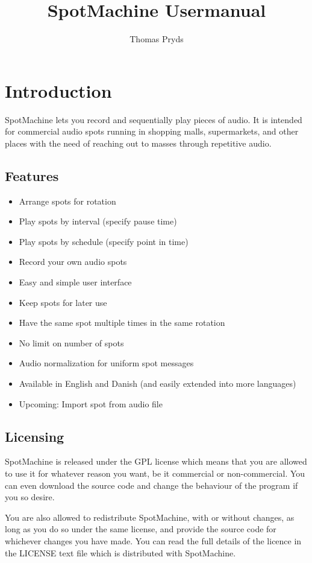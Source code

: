 \documentclass[a4paper,12pt]{article}
\begin{document}
\title{SpotMachine Usermanual}
\author{Thomas Pryds}

\maketitle

\section{Introduction}

SpotMachine lets you record and sequentially play pieces of audio. It is intended for commercial audio spots running in shopping malls, supermarkets, and other places with the need of reaching out to masses through repetitive audio.

\subsection{Features}
\begin{itemize}
\item Arrange spots for rotation
\item Play spots by interval (specify pause time)
\item Play spots by schedule (specify point in time)
\item Record your own audio spots
\item Easy and simple user interface
\item Keep spots for later use
\item Have the same spot multiple times in the same rotation
\item No limit on number of spots
\item Audio normalization for uniform spot messages
\item Available in English and Danish (and easily extended into more languages)
\item Upcoming: Import spot from audio file
\end{itemize}

\subsection{Licensing}
SpotMachine is released under the GPL license which means that you are allowed to use it for whatever reason you want, be it commercial or non-commercial. You can even download the source code and change the behaviour of the program if you so desire.

You are also allowed to redistribute SpotMachine, with or without changes, as long as you do so under the same license, and provide the source code for whichever changes you have made. You can read the full details of the licence in the LICENSE text file which is distributed with SpotMachine.
\end{document}
